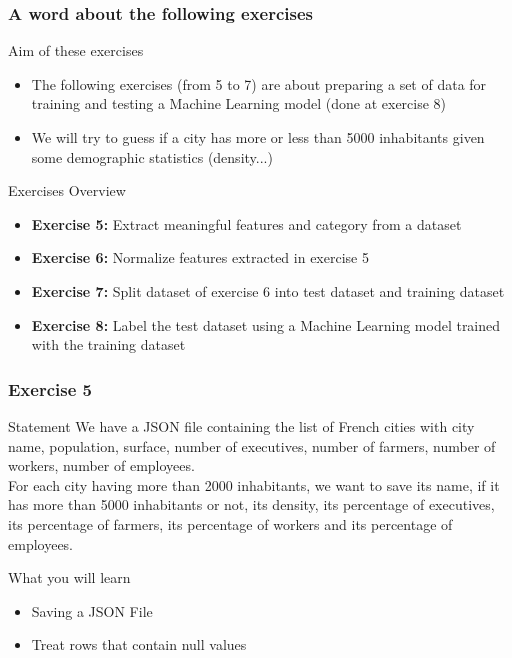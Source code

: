\documentclass[slidetop,9pt,utf8]{beamer}
\begin{document}
\begin{frame}
  \frametitle{A word about the following exercises}

  \begin{block}{Aim of these exercises}
    \begin{itemize}
      \item The following exercises (from 5 to 7) are about preparing a set of data for training and testing a Machine Learning model (done at exercise 8)
      \item We will try to guess if a city has more or less than 5000 inhabitants given some demographic statistics (density...)
    \end{itemize}
  \end{block}

  \begin{block}{Exercises Overview}
    \begin{itemize}
      \item \textbf{Exercise 5:} Extract meaningful features and category from a dataset
      \item \textbf{Exercise 6:} Normalize features extracted in exercise 5
      \item \textbf{Exercise 7:} Split dataset of exercise 6 into test dataset and training dataset
      \item \textbf{Exercise 8:} Label the test dataset using a Machine Learning model trained with the training dataset
    \end{itemize}
  \end{block}

\end{frame}

\begin{frame}
  \frametitle{Exercise 5}

  \begin{block}{Statement}
    We have a JSON file containing the list of French cities with city name, population, surface, number of executives, number of farmers, number of workers, number of employees. 
    \\ \medskip
    For each city having more than 2000 inhabitants, we want to save its name, if it has more than 5000 inhabitants or not, its density, its percentage of executives, its percentage of farmers, its percentage of workers and its percentage of employees.
  \end{block}

  \begin{block}{What you will learn}
    \begin{itemize}
      \item Saving a JSON File
      \item Treat rows that contain null values
    \end{itemize}
  \end{block}

\end{frame}
\end{document}
